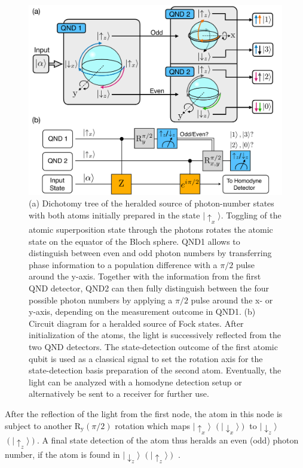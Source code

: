 \documentclass[prl,amsmath,amssymb,bibnotes,aps,longbibliography,12pt]{revtex4-1}
\newcommand{\ket}[1]{|{#1}\rangle}
\begin{document}
\begin{figure}[t]
\centering
\includegraphics[width=\columnwidth]{FigS2.pdf}
\caption{\label{fig:photonsorter} (a) Dichotomy tree of the heralded source of photon-number states with both atoms initially prepared in the state $\ket{\uparrow_x}$. Toggling of the atomic superposition state through the photons rotates the atomic state on the equator of the Bloch sphere. QND1 allows to distinguish between even and odd photon numbers by transferring phase information to a population difference with a $\pi/2$ pulse around the y-axis. Together with the information from the first QND detector, QND2 can then fully distinguish between the four possible photon numbers by applying a $\pi/2$ pulse around the x- or y-axis, depending on the measurement outcome in QND1. (b) Circuit diagram for a heralded source of Fock states. After initialization of the atoms, the light is successively reflected from the two QND detectors. The state-detection outcome of the first atomic qubit is used as a classical signal to set the rotation axis for the state-detection basis preparation of the second atom. Eventually, the light can be analyzed with a homodyne detection setup \cite{hacker2019supplement} or alternatively be sent to a receiver for further use.}
\end{figure}
After the reflection of the light from the first node, the atom in this node is subject to another $\text{R}_\text{y}(\pi/2)$ rotation which maps $\ket{\uparrow_x}$ $(\ket{\downarrow_x})$ to $\ket{\downarrow_z}$ $(\ket{\uparrow_z})$. A final state detection of the atom thus heralds an even (odd) photon number, if the atom is found in $\ket{\downarrow_z}$ $(\ket{\uparrow_z})$ \cite{hacker2019supplement}.
\end{document}
